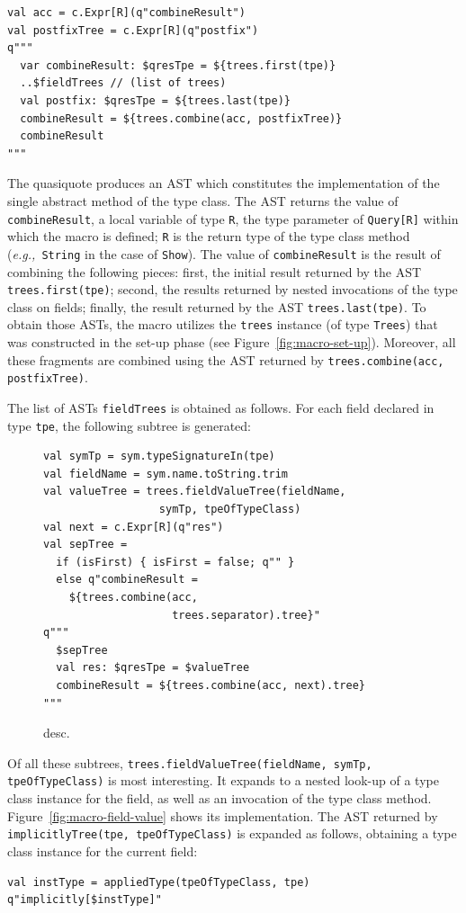 \documentclass[preprint]{sigplanconf}
\newcommand{\eg}{{\em e.g.,~}}
\begin{document}
\begin{lstlisting}
val acc = c.Expr[R](q"combineResult")
val postfixTree = c.Expr[R](q"postfix")
q"""
  var combineResult: $qresTpe = ${trees.first(tpe)}
  ..$fieldTrees // (list of trees)
  val postfix: $qresTpe = ${trees.last(tpe)}
  combineResult = ${trees.combine(acc, postfixTree)}
  combineResult
"""
\end{lstlisting}
\noindent

The quasiquote produces an AST which constitutes the implementation of the
single abstract method of the type class. The AST returns the value of
\verb|combineResult|, a local variable of type \verb|R|, the type parameter of
\verb|Query[R]| within which the macro is defined; \verb|R| is the return type
of the type class method (\eg \verb|String| in the case of \verb|Show|). The
value of \verb|combineResult| is the result of combining the following pieces:
first, the initial result returned by the AST \verb|trees.first(tpe)|; second,
the results returned by nested invocations of the type class on fields;
finally, the result returned by the AST \verb|trees.last(tpe)|. To obtain
those ASTs, the macro utilizes the \verb|trees| instance (of type
\verb|Trees|) that was constructed in the set-up phase (see
Figure~\ref{fig:macro-set-up}). Moreover, all these fragments are combined using the AST
returned by \verb|trees.combine(acc, postfixTree)|.

The list of ASTs \verb|fieldTrees| is obtained as follows. For each field
declared in type \verb|tpe|, the following subtree is generated:

\begin{figure}
\centering
\begin{lstlisting}
val symTp = sym.typeSignatureIn(tpe)
val fieldName = sym.name.toString.trim
val valueTree = trees.fieldValueTree(fieldName,
                  symTp, tpeOfTypeClass)
val next = c.Expr[R](q"res")
val sepTree =
  if (isFirst) { isFirst = false; q"" }
  else q"combineResult =
    ${trees.combine(acc,
                    trees.separator).tree}"
q"""
  $sepTree
  val res: $qresTpe = $valueTree
  combineResult = ${trees.combine(acc, next).tree}
"""
\end{lstlisting}
  \caption{desc.}
  \label{fig:macro-combine-result}
\end{figure}

Of all these subtrees,
\verb|trees.fieldValueTree(fieldName, symTp, tpeOfTypeClass)| is most interesting.
It expands to a nested look-up of a type class instance for the field, as well as
an invocation of the type class method. Figure~\ref{fig:macro-field-value} shows its implementation.
The AST returned by \verb|implicitlyTree(tpe, tpeOfTypeClass)| is expanded as follows,
obtaining a type class instance for the current field:
\begin{lstlisting}
val instType = appliedType(tpeOfTypeClass, tpe)
q"implicitly[$instType]"
\end{lstlisting}
\end{document}
